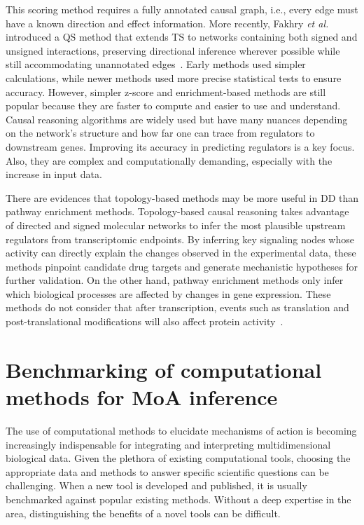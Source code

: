 This scoring method requires a fully annotated causal graph, i.e., every edge must have a known direction and effect information. 
More recently, Fakhry \textit{et al.}~\cite{RN158} introduced a \gls{QS} method that extends TS to networks containing both signed and unsigned interactions, preserving directional inference wherever possible while still accommodating unannotated edges~\cite{RN81}. 
Early methods used simpler calculations, while newer methods used more precise statistical tests to ensure accuracy. However, simpler z-score and enrichment-based methods are still popular because they are faster to compute and easier to use and understand. 
Causal reasoning algorithms are widely used but have many nuances depending on the network's structure and how far one can trace from regulators to downstream genes. 
Improving its accuracy in predicting regulators is a key focus. Also, they are complex and computationally demanding, especially with the increase in input data. 

There are evidences that topology-based methods may be more useful in DD than pathway enrichment methods. Topology-based causal reasoning takes advantage of directed and signed molecular networks to infer the most plausible upstream regulators from transcriptomic endpoints. By inferring key signaling nodes whose activity can directly explain the changes observed in the experimental data, these methods pinpoint candidate drug targets and generate mechanistic hypotheses for further validation. On the other hand, pathway enrichment methods only infer which biological processes are affected by changes in gene expression. These methods do not consider that after transcription, events such as translation and post-translational modifications will also affect protein activity~\cite{RN53}.



\section{Benchmarking of computational methods for MoA inference} %
\label{sec:benchmarking_of_computational_methods_for_MoA_inference}

The use of computational methods to elucidate mechanisms of action is becoming increasingly indispensable for integrating and interpreting multidimensional biological data. Given the plethora of existing computational tools, choosing the appropriate data and methods to answer specific scientific questions can be challenging. When a new tool is developed and published, it is usually benchmarked against popular existing methods. Without a deep expertise in the area, distinguishing the benefits of a novel tools can be difficult. 

